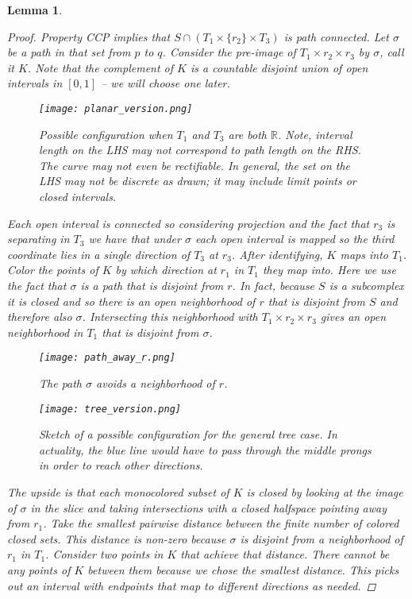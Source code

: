 \documentclass[12pt,parskip=full]{report}
\theoremstyle{plain}
\newtheorem{lem}[thm]{Lemma}
\theoremstyle{definition}
\begin{document}
\begin{lem}
    \begin{proof}
        Property CCP implies that \(S \cap (T_{1} \times \{r_{2}\} \times T_{3} )\) is path connected. Let \(\sigma\) be a path in that set from \(p\) to \(q\). Consider the pre-image of \(T_{1} \times r_{2} \times r_{3}\) by \(\sigma\), call it \(K\). Note that the complement of \(K\) is a countable disjoint union of open intervals in \([0,1]\) -- we will choose one later. 
\begin{figure}[htp]
    \centering
    \texttt{[image: planar\_version.png]}
    \caption{Possible configuration when $T_1$ and $T_3$ are both $\mathbb{R}$. Note, interval length on the LHS may not correspond to path length on the RHS. The curve may not even be rectifiable. In general, the set on the LHS may not be discrete as drawn; it may include limit points or closed intervals.}
    \label{fig:square}
\end{figure}
        Each open interval is connected so considering projection and the fact that \(r_{3}\) is separating in \(T_{3}\) we have that under \(\sigma\) each open interval is mapped so the third coordinate lies in a single direction of \(T_{3}\) at \(r_{3}\). After identifying, \(K\) maps into \(T_{1}\). Color the points of \(K\) by which direction at \(r_1\) in \(T_{1}\) they map into. Here we use the fact that \(\sigma\) is a path that is disjoint from \(r\). In fact, because \(S\) is a subcomplex it is closed and so there is an open neighborhood of \(r\) that is disjoint from \(S\) and therefore also  \(\sigma\). Intersecting this neighborhood with \(T_{1} \times r_{2} \times r_{3}\) gives an open neighborhood in \(T_{1}\) that is disjoint from \(\sigma\). 
\begin{figure}[!h]
    \centering
    \texttt{[image: path\_away\_r.png]}
    \caption{The path $\sigma$ avoids a neighborhood of $r$.}
    \label{fig:square}
\end{figure}
\begin{figure}[!h]
    \centering
    \texttt{[image: tree\_version.png]}
    \caption{Sketch of a possible configuration for the general tree case. In actuality, the blue line would have to pass through the middle prongs in order to reach other directions.}
    \label{fig:square}
\end{figure}
        The upside is that each monocolored subset of \(K\) is closed by looking at the image of \(\sigma\) in the slice and taking intersections with a closed halfspace pointing away from \(r_{1}\). Take the smallest pairwise distance between the finite number of colored closed sets. This distance is non-zero because \(\sigma\) is disjoint from a neighborhood of $r_1$ in $T_1$. Consider two points in \(K\) that achieve that distance. There cannot be any points of \(K\) between them because we chose the smallest distance. This picks out an interval with endpoints that map to different directions as needed.
     \end{proof}
\end{lem}
\end{document}
